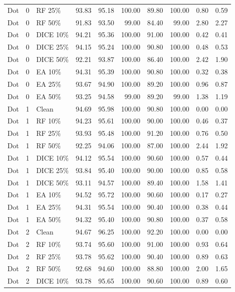 {\begin{longtable}{rllrrrrrrr}
Dot & 0 & RF 25\% & 93.83 & 95.18 & 100.00 & 89.80 & 100.00 & 0.80 & 0.59 \\
Dot & 0 & RF 50\% & 91.83 & 93.50 & 99.00 & 84.40 & 99.00 & 2.80 & 2.27 \\
Dot & 0 & DICE 10\% & 94.21 & 95.36 & 100.00 & 91.00 & 100.00 & 0.42 & 0.41 \\
Dot & 0 & DICE 25\% & 94.15 & 95.24 & 100.00 & 90.80 & 100.00 & 0.48 & 0.53 \\
Dot & 0 & DICE 50\% & 92.21 & 93.87 & 100.00 & 86.40 & 100.00 & 2.42 & 1.90 \\
Dot & 0 & EA 10\% & 94.31 & 95.39 & 100.00 & 90.80 & 100.00 & 0.32 & 0.38 \\
Dot & 0 & EA 25\% & 93.67 & 94.90 & 100.00 & 89.20 & 100.00 & 0.96 & 0.87 \\
Dot & 0 & EA 50\% & 93.25 & 94.58 & 99.00 & 89.20 & 99.00 & 1.38 & 1.19 \\
Dot & 1 & Clean & 94.69 & 95.98 & 100.00 & 90.80 & 100.00 & 0.00 & 0.00 \\
Dot & 1 & RF 10\% & 94.23 & 95.61 & 100.00 & 90.00 & 100.00 & 0.46 & 0.37 \\
Dot & 1 & RF 25\% & 93.93 & 95.48 & 100.00 & 91.20 & 100.00 & 0.76 & 0.50 \\
Dot & 1 & RF 50\% & 92.25 & 94.06 & 100.00 & 87.00 & 100.00 & 2.44 & 1.92 \\
Dot & 1 & DICE 10\% & 94.12 & 95.54 & 100.00 & 90.60 & 100.00 & 0.57 & 0.44 \\
Dot & 1 & DICE 25\% & 93.84 & 95.40 & 100.00 & 90.00 & 100.00 & 0.85 & 0.58 \\
Dot & 1 & DICE 50\% & 93.11 & 94.57 & 100.00 & 89.40 & 100.00 & 1.58 & 1.41 \\
Dot & 1 & EA 10\% & 94.52 & 95.72 & 100.00 & 90.60 & 100.00 & 0.17 & 0.27 \\
Dot & 1 & EA 25\% & 94.31 & 95.54 & 100.00 & 90.40 & 100.00 & 0.38 & 0.44 \\
Dot & 1 & EA 50\% & 94.32 & 95.40 & 100.00 & 90.80 & 100.00 & 0.37 & 0.58 \\
Dot & 2 & Clean & 94.67 & 96.25 & 100.00 & 92.20 & 100.00 & 0.00 & 0.00 \\
Dot & 2 & RF 10\% & 93.74 & 95.60 & 100.00 & 91.00 & 100.00 & 0.93 & 0.64 \\
Dot & 2 & RF 25\% & 93.78 & 95.62 & 100.00 & 90.40 & 100.00 & 0.89 & 0.63 \\
Dot & 2 & RF 50\% & 92.68 & 94.60 & 100.00 & 88.80 & 100.00 & 2.00 & 1.65 \\
Dot & 2 & DICE 10\% & 93.78 & 95.65 & 100.00 & 90.60 & 100.00 & 0.89 & 0.60 \\

\end{longtable}}

